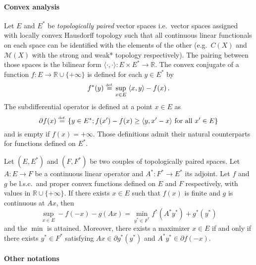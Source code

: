 \paragraph{Convex analysis}
Let $E$ and $E^*$ be \emph{topologically paired} vector spaces i.e.\ vector spaces assigned with locally convex Hausdorff topology such that all continuous linear functionals on each space can be identified with the elements of the other (e.g.\ $C(X)$ and $\mathcal{M}(X)$ with the strong and weak* topology respectively). The pairing between those spaces is the bilinear form $\langle \cdot , \cdot \rangle : E \times E^* \to \mathbb{R}$. The convex conjugate of a function $f:E\to \mathbb{R} \cup \{+\infty\}$ is defined for each $y\in E^*$ by
\[
f^*(y) \stackrel{\mbox{\upshape\tiny def.}}{=} \sup_{x\in E}\; \langle x, y \rangle - f(x) \, .
\]
The subdifferential operator is defined at a point $x\in E$ as
\[
\partial f (x) \stackrel{\mbox{\upshape\tiny def.}}{=} \left\{ y \in E^* ; f(x')-f(x) \geq \langle y, x'-x \rangle \text{ for all $x'\in E$}\right\}
\]
and is empty if $f(x)=+\infty$. Those definitions admit their natural counterparts for functions defined on $E^*$.

\begin{theorem}
\label{thm_FR}
Let $(E,E^*)$ and $(F,F^*)$ be two couples of topologically paired spaces. Let $A : E \to F$ be a continuous linear operator and $A^*:F^* \to E^*$ its adjoint. Let $f$ and $g$ be l.s.c.\ and proper convex functions defined on $E$ and $F$ respectively, with values in $\mathbb{R}\cup \{+\infty\}$. If there exists $x\in E$ such that $f(x)$ is finite and $g$ is continuous at $Ax$, then
\[
\sup_{x \in E} - f(-x) - g(Ax) = \min_{y^* \in F^*} f^*(A^*y^*) + g^*(y^*)
\]
and the $\min$ is attained. Moreover, there exists a maximizer $x\in E$ if and only if there exists $y^*\in F^*$ satisfying $Ax \in \partial g^*(y^*)$ and $A^*y^* \in \partial f(-x)$.
\end{theorem}

\paragraph{Other notations \\}


